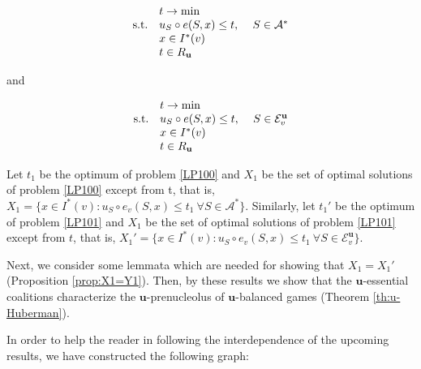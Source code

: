 \documentclass[a4paper,12pt]{article}
\theoremstyle{definition}
\theoremstyle{remark}
\begin{document}
\begin{equation}\label{LP100}
\begin{array}{llr}
& t \to \min & \\
\textup{s.t.} & u_S \circ e(S, x) \leq t, & \ S \in \mathcal{A}^\ast \\
& x \in I^\ast (v) &  \\
& t \in R_{\mathbf{u}} & 
\end{array}
\end{equation}

\noindent and

\begin{equation}\label{LP101}
\begin{array}{llr}
& t \to \min & \\
\textup{s.t.} & u_S \circ e(S, x) \leq t, & \ S \in \mathcal{E}_v^\mathbf{u} \\
& x \in I^\ast (v) &  \\
& t \in R_{\mathbf{u}} & 
\end{array}
\end{equation}

Let $t_1$ be the optimum of problem \eqref{LP100} and $X_1$ be the set of optimal solutions of problem \eqref{LP100} except from t, that is, $X_1 = \{x\in I^\ast (v) \colon u_S \circ e_v (S,x) \leq t_1 \ \forall S\in \mathcal{A}^\ast \}$. Similarly, let $t_1'$ be the optimum of problem \eqref{LP101} and $X_1$ be the set of optimal solutions of problem \eqref{LP101} except from $t$, that is, $X_1' = \{x\in I^\ast (v) \colon u_S \circ e_v (S,x) \leq t_1 \ \forall S\in \mathcal{E}^\mathbf{u}_v \}$.
 

Next, we consider some lemmata which are needed for showing that $X_1 = X_1'$ (Proposition \ref{prop:X1=Y1}). Then, by these results we show that the $\mathbf{u}$-essential coalitions characterize the $\mathbf{u}$-prenucleolus of $\mathbf{u}$-balanced games (Theorem \ref{th:u-Huberman}). 

In order to help the reader in following the interdependence of the upcoming results, we have constructed the following graph:  %

\bigskip
\end{document}
